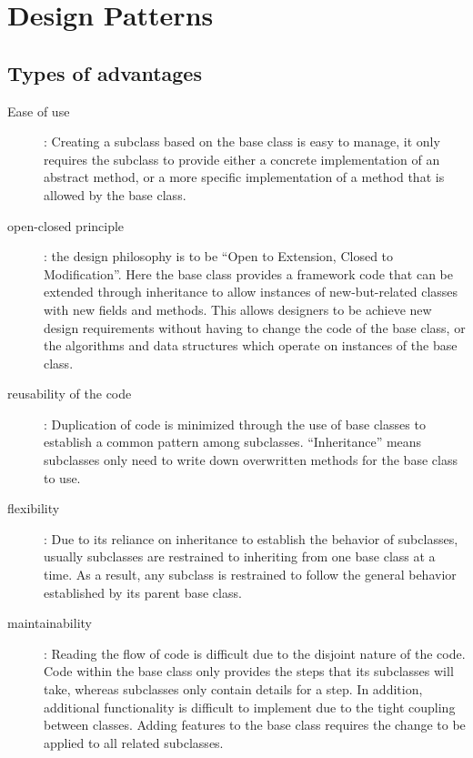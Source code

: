 \section{Design Patterns}

\subsection{Types of advantages}
\begin{description}
    \item[Ease of use]: Creating a subclass based on the base class is easy
        to manage, it only requires the subclass to provide either a
        concrete implementation of an abstract method, or a more specific
        implementation of a method that is allowed by the base class.
    \item[open-closed principle]: the design philosophy is to be ``Open to
        Extension, Closed to Modification''.  Here the base class provides a
        framework code that can be extended through inheritance to allow
        instances of new-but-related classes with new fields and methods.
        This allows designers to be achieve new design requirements without
        having to change the code of the base class, or the algorithms and
        data structures which operate on instances of the base class.
    \item[reusability of the code]: Duplication of code is minimized through
        the use of base classes to establish a common pattern among
        subclasses. ``Inheritance'' means subclasses only need to write down
        overwritten methods for the base class to use.
    \item[flexibility]: Due to its reliance on
        inheritance to establish the behavior of subclasses, usually
        subclasses are restrained to inheriting from one base class at a
        time. As a result, any subclass is restrained to follow the general
        behavior established by its parent base class.
    \item[maintainability]: Reading the flow of code is
        difficult due to the disjoint nature of the code. Code within the
        base class only provides the steps that its subclasses will take,
        whereas subclasses only contain details for a step. In addition,
        additional functionality is difficult to implement due to the tight
        coupling between classes. Adding features to the base class
        requires the change to be applied to all related subclasses.
\end{description}

